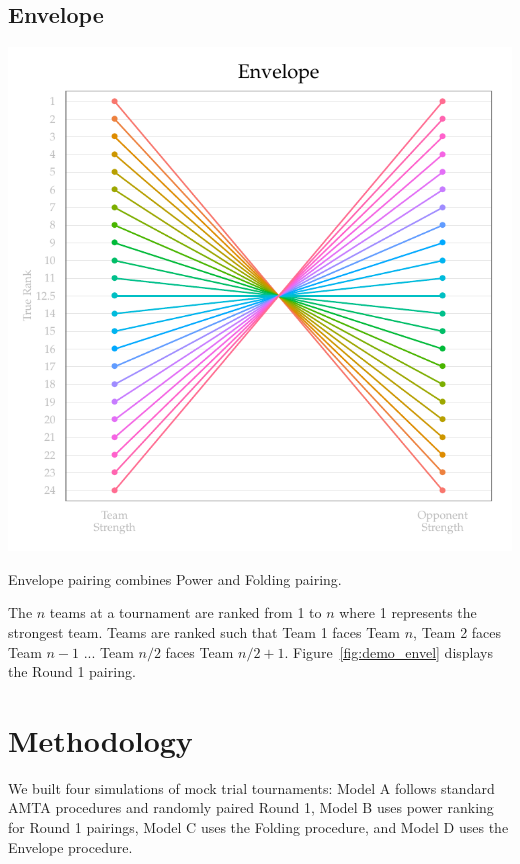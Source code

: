 \documentclass{tufte-handout}
\begin{document}
\subsection{Envelope}
\begin{marginfigure}%
  \includegraphics[width=\linewidth]{envelope_demo.pdf}
  \caption{Envelope pairing combines Power and Folding pairing.}
  \label{fig:demo_envel}
\end{marginfigure}
The $n$ teams at a tournament are ranked from 1 to $n$ where 1 represents the strongest team. Teams are ranked such that Team 1 faces Team $n$, Team 2 faces Team $n-1$ ... Team $n/2$ faces Team $n/2 + 1$. Figure~\ref{fig:demo_envel} displays the Round 1 pairing.

\section{Methodology}
We built four simulations of mock trial tournaments: Model A follows standard AMTA procedures and randomly paired Round 1, Model B uses power ranking for Round 1 pairings, Model C uses the Folding procedure, and Model D uses the Envelope procedure.
\end{document}
